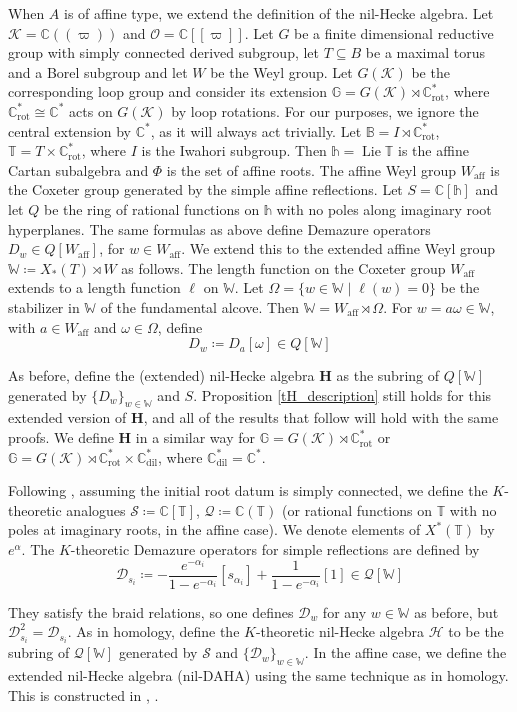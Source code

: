 \documentclass[11pt]{article}
\newcommand{\C}{\mathbb{C}}
\renewcommand{\O}{\mathcal{O}}
\newcommand{\K}{\mathcal{K}}
\renewcommand{\S}{\mathcal{S}}
\renewcommand{\H}{\textbf{H}}
\newcommand{\bbG}{\mathbb{G}}
\newcommand{\1}{\mathbb{1}}
\renewcommand{\th}{\mathbb{h}}
\newcommand{\tW}{\mathbb{W}}
\newcommand{\tT}{\mathbb{T}}
\newcommand{\Crot}{\C^*_{\text{rot}}}
\newcommand{\Cdil}{\C^*_{\text{dil}}}
\newcommand{\Waff}{W_{\text{aff}}}
\renewcommand{\subset}{\subseteq}
\theoremstyle{definition}
\numberwithin{equation}{section}
\begin{document}
When $A$ is of affine type, we extend the definition of the nil-Hecke algebra. Let $\K=\C((\varpi))$ and $\O=\C[[\varpi]]$. Let $G$ be a finite dimensional reductive group with simply connected derived subgroup, let $T \subset B$ be a maximal torus and a Borel subgroup and let $W$ be the Weyl group. Let $G(\K)$ be the corresponding loop group and consider its extension $\mathbb{G} = G(\K) \rtimes \Crot$, where $\Crot \cong \C^*$ acts on $G(\K)$ by loop rotations. For our purposes, we ignore the central extension by $\C^*$, as it will always act trivially. Let $\mathbb{B} = I \rtimes \Crot$, $\mathbb{T} = T \times \Crot$, where $I$ is the Iwahori subgroup. Then $\mathbb{h} = \operatorname{Lie} \mathbb{T}$ is the affine Cartan subalgebra and $\mathbb{\Phi}$ is the set of affine roots. The affine Weyl group $\Waff$ is the Coxeter group generated by the simple affine reflections. Let $S=\C[\th]$ and let $Q$ be the ring of rational functions on $\th$ with no poles along imaginary root hyperplanes. The same formulas as above define Demazure operators $D_w \in Q[\Waff]$, for $w \in \Waff$. We extend this to the extended affine Weyl group $\tW \coloneqq X_*(T) \rtimes W$ as follows. The length function on the Coxeter group $\Waff$ extends to a length function $\ell$ on $\tW$. Let $\Omega = \{ w\in \tW \mid \ell(w)=0\}$ be the stabilizer in $\tW$ of the fundamental alcove. Then $\tW = \Waff \rtimes \Omega$. For $w = a\omega \in \tW$, with $a\in \Waff$ and $\omega \in \Omega$, define 
$$D_w \coloneqq D_a [\omega] \in Q[\tW]$$

As before, define the (extended) nil-Hecke algebra $\H$ as the subring of $Q[\tW]$ generated by $\{ D_w\}_{w\in \tW}$ and $S$. Proposition \ref{tH_description} still holds for this extended version of $\H$, and all of the results that follow will hold with the same proofs. We define $\H$ in a similar way for $\bbG = G(\K) \rtimes \Crot$ or $\bbG = G(\K) \rtimes \Crot \times \Cdil$, where $\Cdil=\C^*$.

Following \cite{KK2}, assuming the initial root datum is simply connected, we define the $K$-theoretic analogues $\S \coloneqq \C[\tT]$, $\mathcal{Q}\coloneqq \C(\tT)$ (or rational functions on $\tT$ with no poles at imaginary roots, in the affine case). We denote elements of $X^*(\tT)$ by $e^{\alpha}$. The $K$-theoretic Demazure operators for simple reflections are defined by
$${\mathcal{D}_{s_i}} \coloneqq - \frac{e^{-\alpha_i}}{1-e^{-\alpha_i}} [s_{\alpha_i}]+ \frac{1}{1-e^{-\alpha_i}} [1] \in \mathcal{Q}[\tW]$$

They satisfy the braid relations, so one defines $\mathcal{D}_w$ for any $w\in \tW$ as before, but $\mathcal{D}_{s_i}^2 = {\mathcal{D}_{s_i}}$. As in homology, define the $K$-theoretic nil-Hecke algebra $\mathcal{H}$ to be the subring of $\mathcal{Q}[\tW]$ generated by $\mathcal{S}$ and $\{ 
\mathcal{D}_w\}_{w\in \tW}$. In the affine case, we define the extended nil-Hecke algebra (nil-DAHA) using the same technique as in homology. This is constructed in \cite{Hai}, \cite{CF}.
\end{document}
